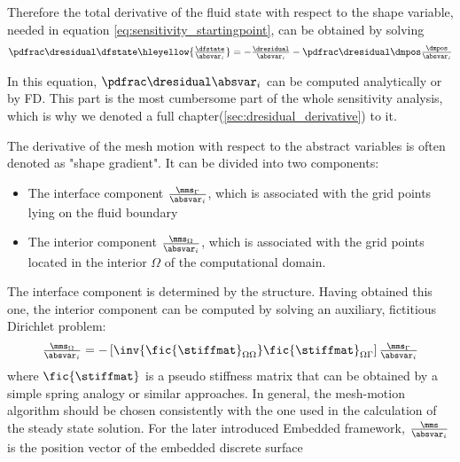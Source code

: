 \documentclass[../main.tex]{subfiles}
\begin{document}
Therefore the total derivative of the fluid state with respect to the shape variable, needed in equation \eqref{eq:sensitivity_startingpoint}, can be obtained by solving
\begin{align}\label{eq:dfstate_by_absvarI}
\PdresidualBYdfstate    \hleyellow{\DdfstateBYabsvarI}=
-\DdresidualBYabsvarI 
-\PdresidualBYdmms       \DdmmsBYabsvarI
\end{align}


In this equation, $\PdresidualBYabsvarI$ can be computed analytically or by \ac{FD}.
This part is the most cumbersome part of the whole sensitivity analysis, which is why we denoted a full chapter(\ref{sec:dresidual_derivative}) to it.

The derivative of the mesh motion with respect to the abstract variables is often denoted as "shape gradient". It can be divided into two components:
\begin{itemize}
\item The interface component $\tfrac{\mms_\Gamma}{\absvar_i}$, which is associated with the grid points lying on the fluid boundary
\item The interior component $\tfrac{\mms_\Omega}{\absvar_i}$, which is associated with the grid points located in the interior $\Omega$ of the computational domain.
\end{itemize}
The interface component is determined by the structure. Having obtained this one, the interior component can be computed by solving an auxiliary, fictitious Dirichlet problem:
\begin{align}
\tfrac{\mms_\Omega}{\absvar_i}=-\left[\inv{\fic{\stiffmat}_{\Omega\Omega}} \fic{\stiffmat}_{\Omega\Gamma}\right] \tfrac{\mms_\Gamma}{\absvar_i}
\end{align}
where $\fic{\stiffmat}$ is a pseudo stiffness matrix that can be obtained by a simple spring analogy or similar approaches.
In general, the mesh-motion algorithm should be chosen consistently with the one used in the calculation of the steady state solution.
For the later introduced Embedded framework, $\tfrac{\mms}{\absvar_i}$ is the position vector of the embedded discrete surface
 \\
 
\end{document}
